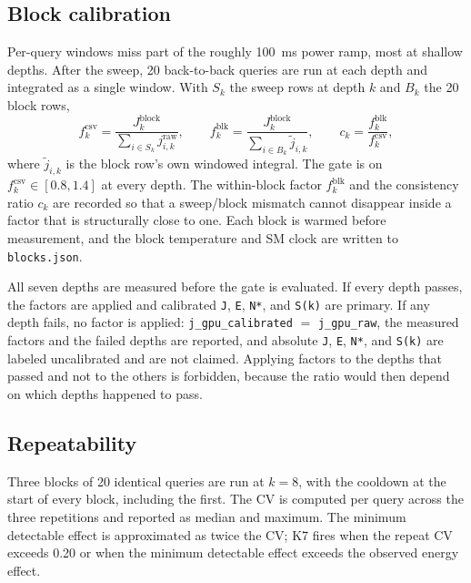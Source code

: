 \subsection{Block calibration}\label{sec:s1-block}

Per-query windows miss part of the roughly 100~ms power ramp, most at shallow depths. After the
sweep, 20 back-to-back queries are run at each depth and integrated as a single window. With
$S_k$ the sweep rows at depth $k$ and $B_k$ the 20 block rows,
\begin{equation}
f^{\mathrm{csv}}_k=\frac{J^{\mathrm{block}}_k}{\sum_{i\in S_k} j^{\mathrm{raw}}_{i,k}},
\qquad
f^{\mathrm{blk}}_k=\frac{J^{\mathrm{block}}_k}{\sum_{i\in B_k} \tilde{j}_{i,k}},
\qquad
c_k=\frac{f^{\mathrm{blk}}_k}{f^{\mathrm{csv}}_k},
\label{s:eq:factor}
\end{equation}
where $\tilde{j}_{i,k}$ is the block row's own windowed integral. The gate is on
$f^{\mathrm{csv}}_k\in[0.8,1.4]$ at every depth. The within-block factor $f^{\mathrm{blk}}_k$ and
the consistency ratio $c_k$ are recorded so that a sweep/block mismatch cannot disappear inside
a factor that is structurally close to one. Each block is warmed before measurement, and the
block temperature and SM clock are written to \texttt{blocks.json}.

All seven depths are measured before the gate is evaluated. If every depth passes, the factors
are applied and calibrated \texttt{J}, \texttt{E}, \texttt{N*}, and \texttt{S(k)} are primary.
If any depth fails, no factor is applied: \texttt{j\_gpu\_calibrated} $=$
\texttt{j\_gpu\_raw}, the measured factors and the failed depths are reported, and absolute
\texttt{J}, \texttt{E}, \texttt{N*}, and \texttt{S(k)} are labeled uncalibrated and are not
claimed. Applying factors to the depths that passed and not to the others is forbidden, because
the ratio would then depend on which depths happened to pass.

\subsection{Repeatability}\label{sec:s1-repeat}

Three blocks of 20 identical queries are run at $k=8$, with the cooldown at the start of every
block, including the first. The CV is computed per query across the three repetitions and
reported as median and maximum. The minimum detectable effect is approximated as twice the CV;
K7 fires when the repeat CV exceeds 0.20 or when the minimum detectable effect exceeds the
observed energy effect.

